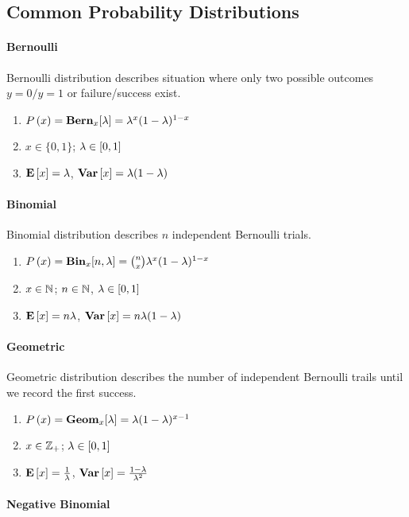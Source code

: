\subsection{Common Probability Distributions}

\paragraph{Bernoulli}

Bernoulli distribution describes situation where only two possible outcomes $y=0 / y=1$ or failure/success exist.
\begin{enumerate}
	\item $P\left(x\right)=\mathbf{Bern}_x[\lambda]=\lambda^x(1-\lambda)^{1-x}$
	\item $x \in \{0,1\}$; $\lambda \in [0,1]$
	\item $\mathbf{E}\left[x\right]=\lambda$, $\mathbf{Var}\left[x\right]=\lambda(1-\lambda)$
\end{enumerate}

\paragraph{Binomial}

Binomial distribution describes $n$ independent Bernoulli trials.
\begin{enumerate}
	\item $P\left(x\right)=\mathbf{Bin}_x[n,\lambda]=\binom{n}{x}\lambda^x(1-\lambda)^{1-x}$
	\item $x\in\mathbb{N}$; $n\in\mathbb{N}$, $\lambda\in[0,1]$
	\item $\mathbf{E}\left[x\right]=n\lambda$, $\mathbf{Var}\left[x\right]=n\lambda(1-\lambda)$
\end{enumerate}

\paragraph{Geometric}

Geometric distribution describes the number of independent Bernoulli trails until we record the first success.
\begin{enumerate}
	\item $P\left(x\right)=\mathbf{Geom}_x[\lambda]=\lambda(1-\lambda)^{x-1}$
	\item $x\in\mathbb{Z}_+$; $\lambda\in[0,1]$
	\item $\mathbf{E}\left[x\right]=\frac{1}{\lambda}$, $\mathbf{Var}\left[x\right]=\frac{1-\lambda}{\lambda^2}$
\end{enumerate}

\paragraph{Negative Binomial}

